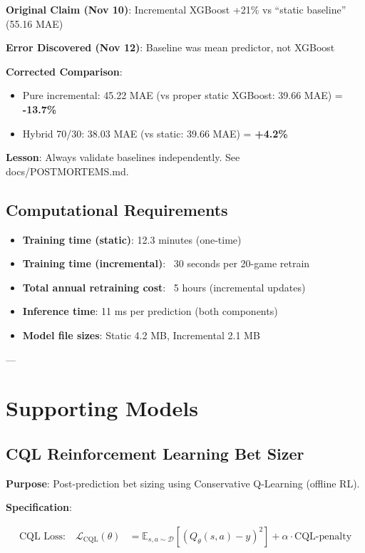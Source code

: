 \textbf{Original Claim (Nov 10)}: Incremental XGBoost +21\% vs ``static baseline'' (55.16 MAE)

\textbf{Error Discovered (Nov 12)}: Baseline was mean predictor, not XGBoost

\textbf{Corrected Comparison}:
\begin{itemize}
\item Pure incremental: 45.22 MAE (vs proper static XGBoost: 39.66 MAE) = \textbf{-13.7\%}
\item Hybrid 70/30: 38.03 MAE (vs static: 39.66 MAE) = \textbf{+4.2\%}
\end{itemize}

\textbf{Lesson}: Always validate baselines independently. See docs/POSTMORTEMS.md.

\subsection{Computational Requirements}

\begin{itemize}
\item \textbf{Training time (static)}: 12.3 minutes (one-time)
\item \textbf{Training time (incremental)}: ~30 seconds per 20-game retrain
\item \textbf{Total annual retraining cost}: ~5 hours (incremental updates)
\item \textbf{Inference time}: 11 ms per prediction (both components)
\item \textbf{Model file sizes}: Static 4.2 MB, Incremental 2.1 MB
\end{itemize}

---

\section{Supporting Models}

\subsection{CQL Reinforcement Learning Bet Sizer}

\textbf{Purpose}: Post-prediction bet sizing using Conservative Q-Learning (offline RL).

\textbf{Specification}:

\begin{align}
\text{CQL Loss:} \quad \mathcal{L}_{\text{CQL}}(\theta) &= \mathbb{E}_{s,a \sim \mathcal{D}} \left[ \left( Q_\theta(s, a) - y \right)^2 \right] + \alpha \cdot \text{CQL-penalty}
\label{eq:cql-loss}
\end{align}

